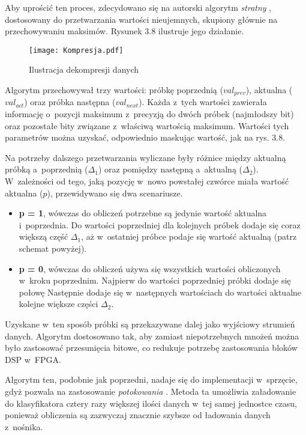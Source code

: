 Aby uprościć ten proces, zdecydowano się na autorski algorytm \textit{stratny} \cite{Wiki:kompresja}, dostosowany do przetwarzania wartości nieujemnych, skupiony głównie na przechowywaniu maksimów. Rysunek 3.8 ilustruje jego działanie.

\begin{figure}[h]
	\centering
	\texttt{[image: Kompresja.pdf]}
	\caption{Ilustracja dekompresji danych}
\end{figure}

\FloatBarrier %

Algorytm przechowywał trzy wartości: próbkę poprzednią ($val_{prev}$), aktualna ($val_{act}$) oraz próbka następna ($val_{next}$). Każda z~tych wartości zawierała informację o~pozycji maksimum z~precyzją do dwóch próbek (najmłodszy bit) oraz pozostałe bity związane z~właściwą wartością maksimum. Wartości tych parametrów można uzyskać, odpowiednio maskując wartość, jak na rys. 3.8.

Na potrzeby dalszego przetwarzania wyliczane były różnice między aktualną próbką a~poprzednią ($\Delta_1$) oraz pomiędzy następną a~aktualną ($\Delta_2$). W~zależności od tego, jaką pozycję w~nowo powstałej czwórce miała wartość aktualna  ($p$), przewidywano się dwa scenariusze.
\begin{itemize}
	\item \textbf{p = 1}, wówczas do obliczeń potrzebne są jedynie wartość aktualna i~poprzednia. Do wartości poprzedniej dla kolejnych próbek dodaje się coraz większą część $\Delta_1$, aż w~ostatniej próbce podaje się wartość aktualną (patrz schemat powyżej).
	\item \textbf{p = 0}, wówczas do obliczeń używa się wszystkich wartości obliczonych w~kroku poprzednim. Najpierw do wartości poprzedniej próbki dodaje się połowę  Następnie dodaje się w~następnych wartościach do wartości aktualne kolejne większe części $\Delta_2$.
\end{itemize}

Uzyskane w~ten sposób próbki są przekazywane dalej jako wyjściowy strumień danych. Algorytm dostosowano tak, aby zamiast niepotrzebnych mnożeń można było zastosować przesunięcia bitowe, co redukuje potrzebę zastosowania bloków DSP w~FPGA.

Algorytm ten, podobnie jak poprzedni, nadaje się do implementacji w~sprzęcie, gdyż pozwala na zastosowanie \textit{potokowania} \cite{Potokowanie}. Metoda ta umożliwia załadowanie do klasyfikatora cztery razy większej ilości danych w~tej samej jednostce czasu, ponieważ obliczenia są zazwyczaj znacznie szybsze od ładowania danych z~nośnika.

